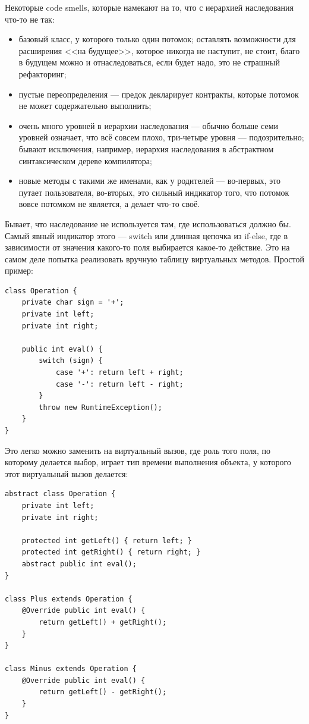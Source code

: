 \documentclass{../../text-style}
\begin{document}
Некоторые code smells, которые намекают на то, что с иерархией наследования что-то не так:

\begin{itemize}
    \item базовый класс, у которого только один потомок; оставлять возможности для расширения <<на будущее>>, которое никогда не наступит, не стоит, благо в будущем можно и отнаследоваться, если будет надо, это не страшный рефакторинг;
    \item пустые переопределения --- предок декларирует контракты, которые потомок не может содержательно выполнить;
    \item очень много уровней в иерархии наследования --- обычно больше семи уровней означает, что всё совсем плохо, три-четыре уровня --- подозрительно; бывают исключения, например, иерархия наследования в абстрактном синтаксическом дереве компилятора;
    \item новые методы с такими же именами, как у родителей --- во-первых, это путает пользователя, во-вторых, это сильный индикатор того, что потомок вовсе потомком не является, а делает что-то своё.
\end{itemize}

Бывает, что наследование не используется там, где использоваться должно бы. Самый явный индикатор этого --- switch или длинная цепочка из if-else, где в зависимости от значения какого-то поля выбирается какое-то действие. Это на самом деле попытка реализовать вручную таблицу виртуальных методов. Простой пример:

\begin{verbatim}
class Operation {
    private char sign = '+';
    private int left;
    private int right;

    public int eval() {
        switch (sign) {
            case '+': return left + right;
            case '-': return left - right;
        }
        throw new RuntimeException();
    }
}
\end{verbatim}

Это легко можно заменить на виртуальный вызов, где роль того поля, по которому делается выбор, играет тип времени выполнения объекта, у которого этот виртуальный вызов делается:

\begin{verbatim}
abstract class Operation {
    private int left;
    private int right;

    protected int getLeft() { return left; }
    protected int getRight() { return right; }
    abstract public int eval();
}

class Plus extends Operation {
    @Override public int eval() { 
        return getLeft() + getRight(); 
    }
}

class Minus extends Operation {
    @Override public int eval() { 
        return getLeft() - getRight(); 
    }
}
\end{verbatim}
\end{document}
